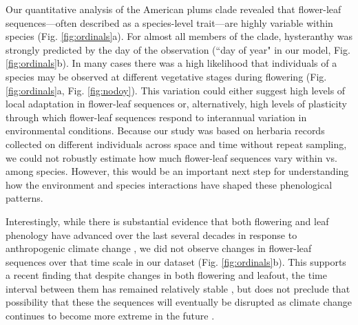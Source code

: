 \documentclass{article}[12pt]
\begin{document}
{Our quantitative analysis of the American plums clade revealed that flower-leaf sequences---often described as a species-level trait---are highly variable within species (Fig. \ref{fig:ordinals}a). For almost all members of the clade, hysteranthy was strongly predicted by the day of the observation (``day of year" in our model, Fig. \ref{fig:ordinals}b). In many cases there was a high likelihood that individuals of a species may be observed at different vegetative stages during flowering (Fig. \ref{fig:ordinals}a, Fig. \ref{fig:nodoy}). This variation could either suggest high levels of local adaptation in flower-leaf sequences or, alternatively, high levels of plasticity through which flower-leaf sequences respond to interannual variation in environmental conditions. Because our study was based on herbaria records collected on different individuals across space and time without repeat sampling, we could not robustly estimate how much flower-leaf sequences vary within vs. among species. However, this would be an important next step for understanding how the environment and species interactions have shaped these phenological patterns.

Interestingly, while there is substantial evidence that both flowering and leaf phenology have advanced over the last several decades in response to anthropogenic climate change \citep{Menzel2006,Cleland2007,Augspurger:2020aa}, we did not observe changes in flower-leaf sequences over that time scale in our dataset (Fig. \ref{fig:ordinals}b). This supports a recent finding that despite changes in both flowering and leafout, the time interval between them has remained relatively stable \citep{Guo:2023wb}, but does not preclude that possibility that these the sequences will eventually be disrupted as climate change continues to become more extreme in the future \citep{Buonaiuto_2021}.

}
\end{document}
